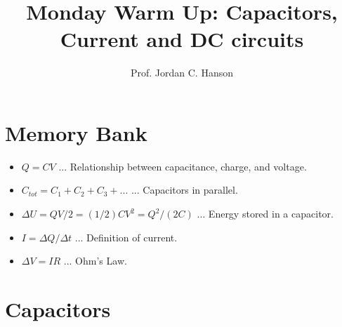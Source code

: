 \documentclass{article}
\begin{document}
\twocolumn

\title{Monday Warm Up: Capacitors, Current and DC circuits}
\author{Prof. Jordan C. Hanson}

\maketitle

\section{Memory Bank}

\begin{itemize}
\item $Q = CV$ ... Relationship between capacitance, charge, and voltage.
\item $C_{tot} = C_1 + C_2 + C_3 + ...$ ... Capacitors in parallel.
\item $\Delta U = QV/2 = (1/2) CV^2 = Q^2/(2C)$ ... Energy stored in a capacitor.
\item $I = \Delta Q/\Delta t$ ... Definition of current.
\item $\Delta V = I R$ ... Ohm's Law.
\end{itemize}

\section{Capacitors}
\end{document}
